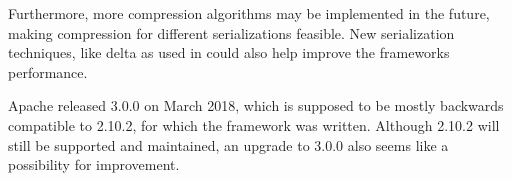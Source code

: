 Furthermore, more compression algorithms may be implemented in the future, making compression for different serializations feasible. New serialization techniques, like delta \cas{} as used in \cite{epstein2012making} could also help improve the frameworks performance.

Apache released \uima{} 3.0.0 on March 2018, which is supposed to be mostly backwards compatible to \uima{} 2.10.2, for which the framework was written. Although \uima{} 2.10.2 will still be supported and maintained, an upgrade to \uima{} 3.0.0 also seems like a possibility for improvement.